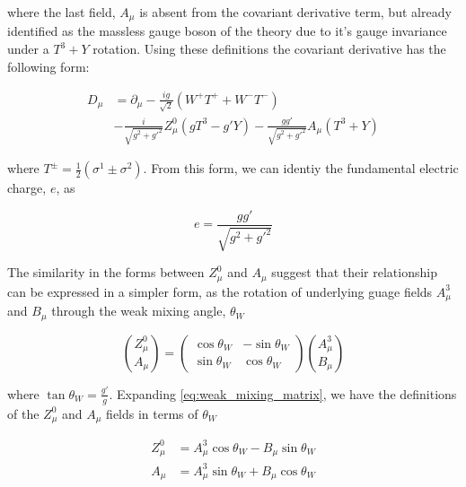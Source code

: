 \noindent where the last field, $A_{\mu}$ is absent from the covariant
derivative term, but already identified as the massless gauge boson of
the theory due to it's gauge invariance under a $T^{3}+Y$ rotation.
Using these definitions the covariant derivative has the following
form:

\begin{equation}\label{eq:ewk_covariant_derivative_mass_eigenstates}
\begin{aligned}
D_{\mu} & = \partial_{\mu} - \frac{ig}{\sqrt{2}}(W^{+}T^{+} + W^{-}T^{-}) \\
  &  - \frac{i}{\sqrt{g^{2}+g'^{2}}}Z_{\mu}^{0}(gT^{3} - g'Y) -
    \frac{gg'}{\sqrt{g^{2}+g'^{2}}}A_{\mu}(T^{3}+Y) 
\end{aligned}
\end{equation} 

\noindent where $T^{\pm} = \frac{1}{2}(\sigma^{1}\pm\sigma^{2})$.  From
this form, we can identiy the fundamental electric charge, $e$, as

\begin{equation}\label{eq:ewk_electric_charge}
e = \frac{gg'}{\sqrt{g^{2}+g'^{2}}}
\end{equation}

The similarity in the forms between $Z_{\mu}^{0}$ and $A_{\mu}$
suggest that their relationship can be expressed in a simpler form, as
the rotation of underlying guage fields $A_{\mu}^{3}$ and $B_{\mu}$
through the weak mixing angle, $\theta_{W}$

\begin{equation}\label{eq:weak_mixing_matrix}
\binom{Z_{\mu}^{0}}{A_{\mu}} = 
\begin{pmatrix}
    \cos{\theta_{W}} & -\sin{\theta_{W}} \\
    \sin{\theta_{W}}  &  \cos{\theta_{W}}
  \end{pmatrix}
\binom{A_{\mu}^{3}}{B_{\mu}}
\end{equation}

\noindent where $\tan{\theta_{W}} = \frac{g'}{g}$.  Expanding
\ref{eq:weak_mixing_matrix}, we have the definitions of the
$Z_{\mu}^{0}$ and $A_{\mu}$ fields in terms of $\theta_{W}$

\begin{equation}\label{eq:ewk_Z_A_defined_with_thetaW}
\begin{aligned}
Z_{\mu}^{0} &= A_{\mu}^{3}\cos{\theta_{W}} - B_{\mu}\sin{\theta_{W}}
\\
A_{\mu} & = A_{\mu}^{3}\sin{\theta_{W}} + B_{\mu}\cos{\theta_{W}}
\end{aligned}
\end{equation}

